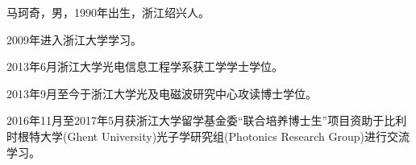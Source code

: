 \begin{resume}
马珂奇，男，1990年出生，浙江绍兴人。

2009年进入浙江大学学习。

2013年6月浙江大学光电信息工程学系获工学学士学位。

2013年9月至今于浙江大学光及电磁波研究中心攻读博士学位。

2016年11月至2017年5月获浙江大学留学基金委“联合培养博士生”项目资助于比利时根特大学(Ghent University)光子学研究组(Photonics Research Group)进行交流学习。
\end{resume}
